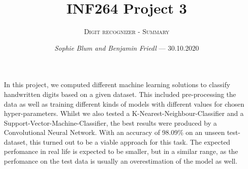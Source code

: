 \documentclass[12pt,a4paper]{scrartcl}		%
\newcommand\svthema{INF264 Project 3}
\newcommand\svperson{Sophie Blum and Benjamin Friedl}
\newcommand\svdatum{30.10.2020}
\newcommand\lvname{Digit recognizer - Summary}
\begin{document}
\title{ \svthema}
\author{\textsc{\lvname}}
\date{ \small \textsl{\svperson} --- \svdatum }
\maketitle

In this project, we computed different machine learning solutions to classify handwritten 
digits based on a given dataset. This included pre-processing the data as well as training 
different kinds of models with different values for chosen hyper-parameters. Whilst we also 
tested a K-Nearest-Neighbour-Classifier and a Support-Vector-Machine-Classifier, the best 
results were produced by a Convolutional Neural Network. With an accuracy of 98.09\% 
on an unseen test-dataset, this turned out to be a viable approach for this task. The 
expected perfomance in real life is expected to be smaller, but in a similar range, as the 
perfomance on the test data is usually an overestimation of the model as well.
\end{document}
